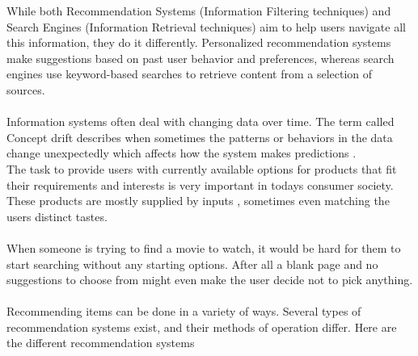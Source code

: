 \documentclass[\myFontSize,oneside,english,hidelinks,a4paper]{article}
\begin{document}
%
While both Recommendation Systems (Information Filtering techniques) and Search Engines (Information Retrieval techniques) aim to help users navigate all this information, they do it differently. Personalized recommendation systems make suggestions based on past user behavior and preferences, whereas search engines use keyword-based searches to retrieve content from a selection of sources.\\\\
%
Information systems often deal with changing data over time. The term called Concept drift describes when sometimes the patterns or behaviors in the data change unexpectedly which affects how the system makes predictions \cite{Sun2024}.\\
The task to provide users with currently available options for products that fit their requirements and interests is very important in todays consumer society. These products are mostly supplied by inputs \cite{Philip2014} , sometimes even matching the users distinct tastes.\\\\
%
When someone is trying to find a movie to watch, it would be hard for them to start searching without any starting options. After all a blank page and no suggestions to choose from might even make the user decide not to pick anything. \\\\
%
\newpage{}
Recommending items can be done in a variety of ways. Several types of recommendation systems exist, and their methods of operation differ. Here are the different recommendation systems\\

%
\end{document}

